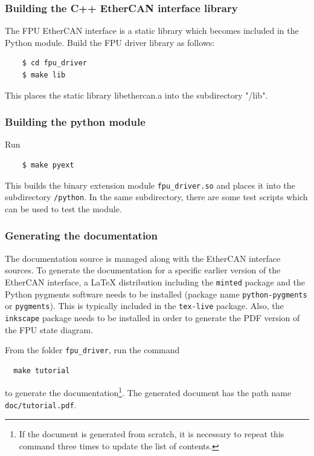 \documentclass[11pt,a4paper]{scrartcl}
\begin{document}
\subsubsection{Building the C++ EtherCAN interface library}
The FPU EtherCAN interface is a static library which becomes included in the
Python module.  Build the FPU driver library as follows:

  \begin{verbatim}
    $ cd fpu_driver
    $ make lib
  \end{verbatim}    

This places the static library libethercan.a into
the subdirectory "/lib".

\subsubsection{Building the python module}

Run

  \begin{verbatim}
    $ make pyext
  \end{verbatim}    

This builds the binary extension module \verb+fpu_driver.so+
and places it into the subdirectory \verb+/python+.
In the same subdirectory, there are some test
scripts which can be used to test the module.

\subsubsection{Generating the documentation}

The documentation source is managed along with the EtherCAN interface sources.  To
generate the documentation for a specific earlier version of the
EtherCAN interface, a \LaTeX{} distribution including the \texttt{minted} package
and the Python pygments software needs to be installed (package name
\texttt{python-pygments} or \texttt{pygments}).  This is typically
included in the \texttt{tex-live} package. Also, the \texttt{inkscape}
package needs to be installed in order to generate the PDF version of
the FPU state diagram.

From the folder \texttt{fpu\_driver}, run the
command
\begin{verbatim}
  make tutorial
\end{verbatim}
to generate the documentation\footnote{If the document is generated
  from scratch, it is necessary to repeat this command three times to
  update the list of contents.}. The generated document has the path
name \texttt{doc/tutorial.pdf}.
\end{document}
